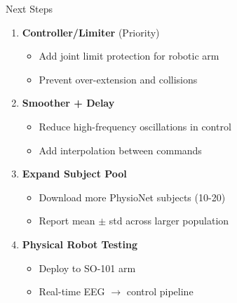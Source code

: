 \documentclass[aspectratio=169, 11pt]{beamer}
\begin{document}
\begin{frame}{Next Steps}
    \begin{enumerate}
        \item \textbf{Controller/Limiter} (Priority)
        \begin{itemize}
            \item Add joint limit protection for robotic arm
            \item Prevent over-extension and collisions
        \end{itemize}
        
        \vspace{3mm}
        \item \textbf{Smoother + Delay}
        \begin{itemize}
            \item Reduce high-frequency oscillations in control
            \item Add interpolation between commands
        \end{itemize}
        
        \vspace{3mm}
        \item \textbf{Expand Subject Pool}
        \begin{itemize}
            \item Download more PhysioNet subjects (10-20)
            \item Report mean $\pm$ std across larger population
        \end{itemize}
        
        \vspace{3mm}
        \item \textbf{Physical Robot Testing}
        \begin{itemize}
            \item Deploy to SO-101 arm
            \item Real-time EEG $\rightarrow$ control pipeline
        \end{itemize}
    \end{enumerate}
\end{frame}
\end{document}
